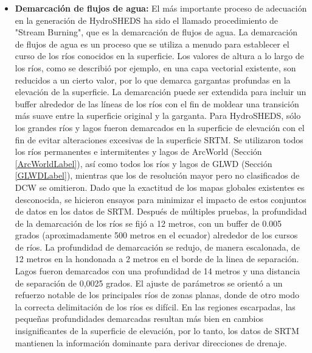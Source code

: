 \documentclass[10pt,a4paper, twoside]{report}
\begin{document}
\begin{itemize}
	\item \textbf{Demarcación de flujos de agua:} El más importante proceso de adecuación en la generación de HydroSHEDS ha sido el llamado procedimiento de "Stream Burning", que es la demarcación de flujos de agua. La demarcación de flujos de agua es un proceso que se utiliza a menudo para establecer el curso de los ríos conocidos en la superficie. Los valores de altura a lo largo de los ríos, como se describió por ejemplo, en una capa vectorial existente, son reducidos a un cierto valor, por lo que demarca gargantas profundas en la elevación de la superficie. La demarcación puede ser extendida para incluir un buffer alrededor de las líneas de los ríos con el fin de moldear una transición más suave entre la superficie original y la garganta. Para HydroSHEDS, sólo los grandes ríos y lagos fueron demarcados en la superficie de elevación con el fin de evitar alteraciones excesivas de la superficie SRTM. Se utilizaron todos los ríos permanentes e intermitentes y lagos de ArcWorld (Sección \ref{ArcWorldLabel}), así como todos los ríos y lagos de GLWD (Sección \ref{GLWDLabel}), mientras que los de resolución mayor pero no clasificados de DCW se omitieron. Dado que la exactitud de los mapas globales existentes es desconocida, se hicieron ensayos para minimizar el impacto de estos conjuntos de datos en los datos de SRTM. Después de múltiples pruebas, la profundidad de la demarcación de los ríos se fijó a 12 metros, con un buffer de 0.005 grados (aproximadamente 500 metros en el ecuador) alrededor de los cursos de ríos. La profundidad de demarcación se redujo, de manera escalonada, de 12 metros en la hondonada a 2 metros en el borde de la linea de separación. Lagos fueron demarcados con una profundidad de 14 metros y una distancia de separación de 0,0025 grados. El ajuste de parámetros se orientó a un refuerzo notable de los principales ríos de zonas planas, donde de otro modo la correcta delimitación de los ríos es difícil. En las regiones escarpadas, las pequeñas profundidades demarcadas resultan más bien en cambios insignificantes de la superficie de elevación, por lo tanto, los datos de SRTM mantienen la información dominante para derivar direcciones de drenaje.	
	

\end{itemize}
\end{document}

